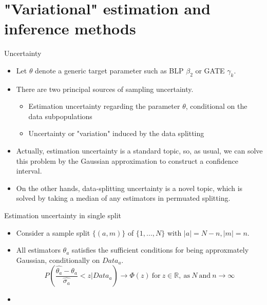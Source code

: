 \documentclass[xcolor=svgnames,aspectratio=169]{beamer}
\newcommand{\R}{\mathbb{R}}
\begin{document}
\section{"Variational" estimation and inference methods}

\begin{frame}{Uncertainty}
    \begin{itemize}
        \item Let $\theta$ denote a generic target parameter such as BLP $\beta_2$ or GATE $\gamma_k$.
        \item There are two principal sources of sampling uncertainty.
        \begin{itemize}
            \item \alert{Estimation uncertainty} regarding the parameter $\theta$, conditional on the data subpopulations
            \item Uncertainty or "variation" \alert{induced by the data splitting}
        \end{itemize}
        \item Actually, estimation uncertainty is a standard topic, so, as usual, we can solve this problem by the \alert{Gaussian approximation} to construct a confidence interval.
        \item On the other hands, data-splitting uncertainty is a novel topic, which is solved by taking a \alert{median} of any estimators in permuated splitting. 
    \end{itemize}
\end{frame}

\begin{frame}{Estimation uncertainty in single split}
    \begin{itemize}
        \item Consider a sample split $\{(a,m)\}$ of $\{1,...,N\}$ with $|a|=N-n, |m|=n$.
        \item All estimators $\theta_a$ satisfies the sufficient conditions for being approxmately Gaussian, conditionally on $Data_a$.
        \[
        P(\frac{\hat{\theta_a}-\theta_a}{\hat{\sigma_a}}<z|Data_a) \to \Phi(z) \ \text{for} \ z\in\R, \ \text{as} \ N \ \text{and} \ n\to\infty
        \]
        \item 
    \end{itemize}
\end{frame}
\end{document}
